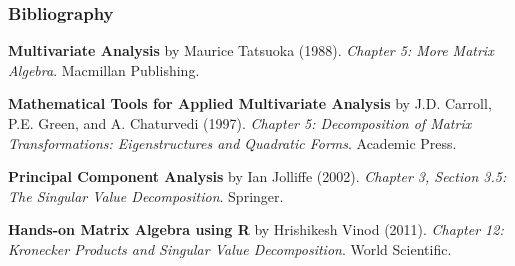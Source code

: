 \documentclass[12pt]{beamer}\usepackage[]{graphicx}\usepackage[]{color}
\begin{document}

\begin{frame}
\frametitle{Bibliography}

{\footnotesize
\bi
  \item \textbf{Multivariate Analysis} by Maurice Tatsuoka (1988).
  \textit{Chapter 5: More Matrix Algebra}. Macmillan Publishing.
  \item \textbf{Mathematical Tools for Applied Multivariate Analysis} by J.D. Carroll, P.E. Green, and A. Chaturvedi (1997). 
  \textit{Chapter 5: Decomposition of Matrix Transformations: Eigenstructures and Quadratic Forms}. Academic Press. 
  \item \textbf{Principal Component Analysis} by Ian Jolliffe (2002). 
  \textit{Chapter 3, Section 3.5: The Singular Value Decomposition}. Springer.
  \item \textbf{Hands-on Matrix Algebra using R} by Hrishikesh Vinod (2011).
  \textit{Chapter 12: Kronecker Products and Singular Value Decomposition}. World Scientific.
\ei
}

\end{frame}

\end{document}
